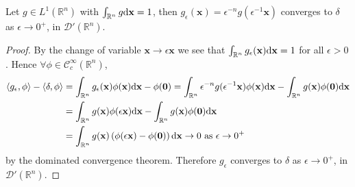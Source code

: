 \begin{pro}
  Let $g\in L^1(\mathbb{R}^n)$ with
  $\int_{\mathbb{R}^n}g\mathrm{d}\mathbf{x} = 1$,
  then $g_{\epsilon}(\mathbf{x}) =
  \epsilon^{-n}g(\epsilon^{-1}\mathbf{x})$
  converges to $\delta$ as $\epsilon\to 0^+$,
  in $\mathcal{D}'(\mathbb{R}^n)$.
\end{pro}

\begin{proof}
  By the change of variable $\mathbf{x}\to\epsilon\mathbf{x}$
  we see that $\int_{\mathbb{R}^n}g_{\epsilon}(\mathbf{x})\mathrm{d}\mathbf{x}=1$ for all $\epsilon>0$.
  Hence $\forall\phi\in\mathcal{C}_c^{\infty}(\mathbb{R}^n)$,
  \begin{align*}
    \left\langle g_{\epsilon}, \phi\right\rangle -
    \left\langle \delta, \phi\right\rangle &=
    \int_{\mathbb{R}^n}g_{\epsilon}(\mathbf{x})\phi(\mathbf{x})\mathrm{d}\mathbf{x} - \phi(\mathbf{0})
                                              = \int_{\mathbb{R}^n}\epsilon^{-n}g(\epsilon^{-1}\mathbf{x})\phi(\mathbf{x})\mathrm{d}\mathbf{x} - \int_{\mathbb{R}^n}g(\mathbf{x})\phi(\mathbf{0})\mathrm{d}\mathbf{x} \\
                                           &= \int_{\mathbb{R}^n}g(\mathbf{x})\phi(\epsilon\mathbf{x})\mathrm{d}\mathbf{x} - \int_{\mathbb{R}^n}g(\mathbf{x})\phi(\mathbf{0})\mathrm{d}\mathbf{x} \\
    &= \int_{\mathbb{R}^n}g(\mathbf{x})\left(\phi(\epsilon\mathbf{x})-\phi(\mathbf{0})\right)\mathrm{d}\mathbf{x} \to 0 \text{ as } \epsilon\to 0^+
  \end{align*}
  by the dominated convergence theorem.
  Therefore $g_{\epsilon}$ converges to $\delta$ as $\epsilon\to 0^+$, in
  $\mathcal{D}'(\mathbb{R}^n)$.
\end{proof}
